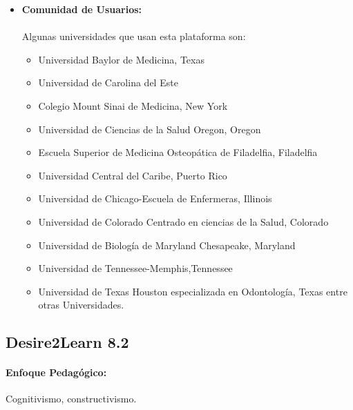	\begin{itemize}
		\item \textbf{Comunidad de Usuarios:}\\ 
		\citep{BB_COM2008}\\
		Algunas universidades que usan esta plataforma son: 
		\begin{itemize}
			\item Universidad Baylor de Medicina, Texas
			\item Universidad de Carolina del Este
			\item Colegio Mount Sinai de Medicina, New York
			\item Universidad de Ciencias de la Salud Oregon, Oregon
			\item Escuela Superior de Medicina Osteopática de Filadelfia, Filadelfia
			\item Universidad Central del Caribe, Puerto Rico
			\item Universidad de Chicago-Escuela de Enfermeras, Illinois
			\item Universidad de Colorado Centrado en ciencias de la Salud, Colorado
			\item Universidad de Biología de Maryland Chesapeake, Maryland
			\item Universidad de Tennessee-Memphis,Tennessee
			\item Universidad de Texas Houston especializada en Odontología, Texas entre otras Universidades.
		\end{itemize}
	\end{itemize}
	
\subsection{Desire2Learn 8.2}
	\paragraph{Enfoque Pedagógico:} Cognitivismo, constructivismo.
